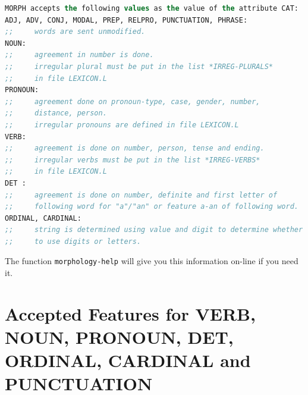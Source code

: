 \documentclass[10pt,a4paper]{report}
\begin{document}
    
   
  
  
\begin{lstlisting}[language=Lisp]
MORPH accepts the following values as the value of the attribute CAT:
ADJ, ADV, CONJ, MODAL, PREP, RELPRO, PUNCTUATION, PHRASE: 
;;     words are sent unmodified.
NOUN:
;;     agreement in number is done.
;;     irregular plural must be put in the list *IRREG-PLURALS*
;;     in file LEXICON.L
PRONOUN:
;;     agreement done on pronoun-type, case, gender, number,
;;     distance, person.
;;     irregular pronouns are defined in file LEXICON.L
VERB:
;;     agreement is done on number, person, tense and ending.
;;     irregular verbs must be put in the list *IRREG-VERBS*
;;     in file LEXICON.L
DET :
;;     agreement is done on number, definite and first letter of 
;;     following word for "a"/"an" or feature a-an of following word.
ORDINAL, CARDINAL:
;;     string is determined using value and digit to determine whether
;;     to use digits or letters.
\end{lstlisting}

The function {\tt morphology-help} will give you this information on-line if
you need it. 


\section{Accepted Features for VERB, NOUN, PRONOUN, DET, ORDINAL,
CARDINAL and PUNCTUATION} 
\end{document}
